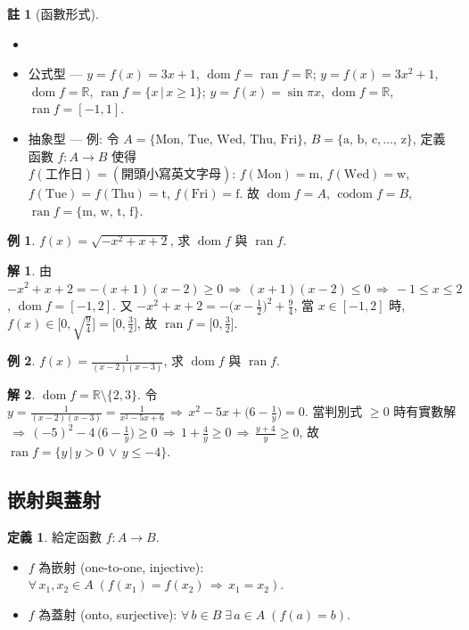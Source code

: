 \documentclass[12pt]{extarticle}
\newcommand{\ds}{\displaystyle}
\newcommand{\ie}{\,\Longrightarrow\,}
\DeclareMathOperator*{\dom}{dom}
\DeclareMathOperator*{\codom}{codom}
\DeclareMathOperator*{\ran}{ran}
\theoremstyle{definition}
\newtheorem*{dfn}{定義}
\newtheorem*{ex}{例}
\newtheorem*{rmk}{註}
\newtheorem*{sol}{解}
\begin{document}
\begin{rmk}[函數形式]
  \begin{itemize}\setlength\itemsep{0em}
    \item[]
    \item 公式型 --- $y = f(x) = 3x + 1$, $\dom f = \ran f = \mathbb{R}$; $y = f(x) = 3x^2 + 1$, $\dom f = \mathbb{R}$, $\ran f = \{x\,|\, x\geqslant 1\}$; $y = f(x) = \sin\pi x$, $\dom f = \mathbb{R}$, $\ran f = [-1, 1]$.
    \item 抽象型 --- 例: 令 $A = \{\text{Mon},\,\text{Tue},\,\text{Wed},\,\text{Thu},\,\text{Fri}\}$, $B = \{\text{a},\,\text{b},\,\text{c}, \ldots,\,\text{z}\}$, 定義函數 $f:A\to B$ 使得 \\$f(\text{工作日}) = (\text{開頭小寫英文字母})$: $f(\text{Mon}) = \text{m}$, $f(\text{Wed}) = \text{w}$, $f(\text{Tue}) = f(\text{Thu}) = \text{t}$, $f(\text{Fri}) = \text{f}$. 故 $\dom f = A$, $\codom f = B$, $\ran f = \{\text{m},\,\text{w},\,\text{t},\,\text{f}\}$. 
  \end{itemize}
\end{rmk}

\begin{ex}
  $f(x) = \sqrt{-x^2 + x + 2}$, 求 $\dom f$ 與 $\ran f$. 
\end{ex}

\begin{sol}
  由 $-x^2 + x + 2 = -(x + 1)(x - 2)\geqslant 0 \ie (x + 1)(x - 2)\leqslant 0 \ie -1\leqslant x\leqslant 2$, $\dom f = [-1, 2]$. 又 $-x^2 + x + 2 = -\big(x - \frac{1}{2}\big)^2 + \frac{9}{4}$, 當 $x\in [-1, 2]$ 時, $f(x)\in\big[0, \sqrt{\frac{9}{4}}\big] = \big[0, \frac{3}{2}\big]$, 故 $\ran f = \big[0, \frac{3}{2}\big]$. 
\end{sol}

\begin{ex}
  $\ds f(x) = \frac{1}{(x-2)(x-3)}$, 求 $\dom f$ 與 $\ran f$. 
\end{ex}

\begin{sol}
  $\dom f = \mathbb{R}\setminus\{2, 3\}$. 令 $\ds y = \frac{1}{(x - 2)(x - 3)} = \frac{1}{x^2 - 5x + 6}\ie x^2 - 5 x + \big(6 - \frac{1}{y}\big) = 0$. 當判別式 $\geqslant 0$ 時有實數解 $\ds\ie (-5)^2 - 4\,\Big(6 - \frac{1}{y}\Big)\geqslant 0 \ie 1 + \frac{4}{y}\geqslant 0 \ie \frac{y + 4}{y}\geqslant 0$, 故 $\ds\ran f = \{y\,|\,y > 0\,\vee\,y\leqslant -4\}$. 
\end{sol}

\subsection*{嵌射與蓋射}
\begin{dfn} 給定函數 $f: A\to B$. 
  \begin{itemize}\setlength\itemsep{0em}
    \item $f$ 為嵌射 (one-to-one, injective): $\forall\,x_1, x_2\in A\;(f(x_1) = f(x_2) \ie x_1 = x_2)$. 
    \item $f$ 為蓋射 (onto, surjective): $\forall\,b\in B\;\exists\,a\in A\;(f(a) = b)$. 
  \end{itemize}
\end{dfn}
\end{document}

